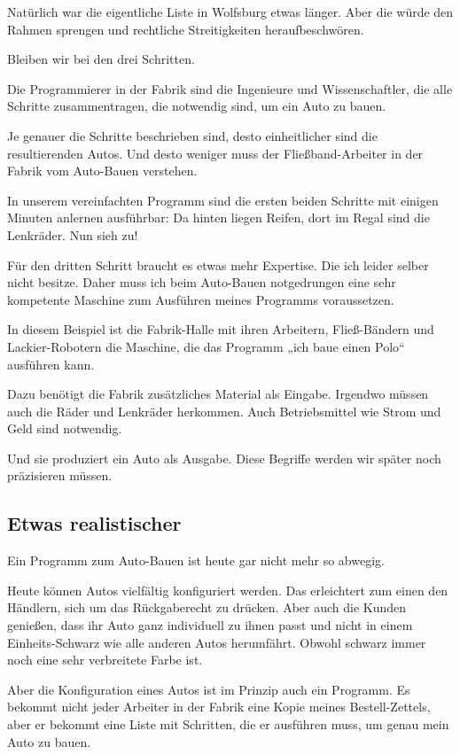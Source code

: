 \documentclass[a5paper,ngerman,9pt]{article}
\begin{document}
\begin{multicols}{2}
	Natürlich war die eigentliche Liste in Wolfsburg etwas länger.
	Aber die würde den Rahmen sprengen und rechtliche Streitigkeiten
	heraufbeschwören.

	Bleiben wir bei den drei Schritten.

	Die Programmierer in der Fabrik sind die Ingenieure und
	Wissenschaftler, die alle Schritte zusammentragen, die notwendig
	sind, um ein Auto zu bauen.

	Je genauer die Schritte beschrieben sind, desto einheitlicher sind
	die resultierenden Autos.
	Und desto weniger muss der Fließband-Arbeiter in der Fabrik vom
	Auto-Bauen verstehen.

	In unserem vereinfachten Programm sind die ersten beiden Schritte
	mit einigen Minuten anlernen ausführbar:
	Da hinten liegen Reifen, dort im Regal sind die Lenkräder.
	Nun sieh zu!

	Für den dritten Schritt braucht es etwas mehr Expertise.
	Die ich leider selber nicht besitze.
	Daher muss ich beim Auto-Bauen notgedrungen eine sehr kompetente
	Maschine zum Ausführen meines Programms voraussetzen.

	In diesem Beispiel ist die Fabrik-Halle mit ihren Arbeitern,
	Fließ-Bändern und Lackier-Robotern die Maschine, die das Programm
	„ich baue einen Polo“ ausführen kann.

	Dazu benötigt die Fabrik zusätzliches Material als Eingabe.
	Irgendwo müssen auch die Räder und Lenkräder herkommen.
	Auch Betriebsmittel wie Strom und Geld sind notwendig.
	
	Und sie produziert ein Auto als Ausgabe.
	Diese Begriffe werden wir später noch präzisieren müssen.

	\subsection{Etwas realistischer}

	Ein Programm zum Auto-Bauen ist heute gar nicht mehr so abwegig.

	Heute können Autos vielfältig konfiguriert werden.
	Das erleichtert zum einen den Händlern, sich um das Rückgaberecht
	zu drücken.
	Aber auch die Kunden genießen, dass ihr Auto ganz individuell zu
	ihnen passt und nicht in einem Einheits-Schwarz wie alle anderen
	Autos herumfährt. Obwohl schwarz immer noch eine sehr verbreitete
	Farbe ist.

	Aber die Konfiguration eines Autos ist im Prinzip auch ein Programm.
	Es bekommt nicht jeder Arbeiter in der Fabrik eine Kopie meines
	Bestell-Zettels, aber er bekommt eine Liste mit Schritten, die er
	ausführen muss, um genau mein Auto zu bauen.


\end{multicols}
\end{document}
